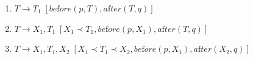 \begin{enumerate}
    \item $T \rightarrow T_1 \; [be\text{f}ore(p,T), a\text{f}ter(T,q)]$
    \item $T \rightarrow X_1, T_1 \; [X_1 \prec T_1, be\text{f}ore(p,X_1), a\text{f}ter(T,q)]$
    \item $T \rightarrow X_1, T_1, X_2 \; [X_1 \prec T_1 \prec X_2, be\text{f}ore(p,X_1), a\text{f}ter(X_2,q)]$
\end{enumerate}

